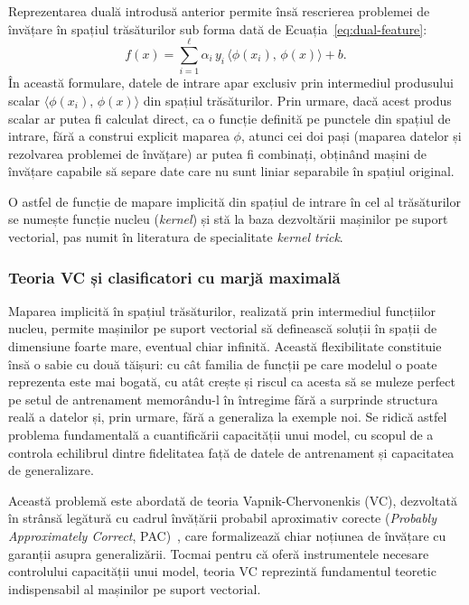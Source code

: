 Reprezentarea duală introdusă anterior permite însă rescrierea problemei de învățare în spațiul trăsăturilor sub forma dată de Ecuația~\ref{eq:dual-feature}:
\begin{equation}
  f(x) = \sum_{i=1}^{\ell} \alpha_i\, y_i\, \langle \phi(x_i),\, \phi(x) \rangle + b.
  \label{eq:dual-feature}
\end{equation}
În această formulare, datele de intrare apar exclusiv prin intermediul produsului scalar $\langle \phi(x_i),\, \phi(x) \rangle$ din spațiul trăsăturilor. Prin urmare, dacă acest produs scalar ar putea fi calculat direct, ca o funcție definită pe punctele din spațiul de intrare, fără a construi explicit maparea $\phi$, atunci cei doi pași (maparea datelor și rezolvarea problemei de învățare) ar putea fi combinați, obținând mașini de învățare capabile să separe date care nu sunt liniar separabile în spațiul original.

O astfel de funcție de mapare implicită din spațiul de intrare în cel al trăsăturilor se numește funcție nucleu (\textit{kernel}) și stă la baza dezvoltării mașinilor pe suport vectorial, pas numit în literatura de specialitate \textit{kernel trick}.

\subsubsection{Teoria VC și clasificatori cu marjă maximală}
Maparea implicită în spațiul trăsăturilor, realizată prin intermediul funcțiilor nucleu, permite mașinilor pe suport vectorial să definească soluții în spații de dimensiune foarte mare, eventual chiar infinită. Această flexibilitate constituie însă o sabie cu două tăișuri: cu cât familia de funcții pe care modelul o poate reprezenta este mai bogată, cu atât crește și riscul ca acesta să se muleze perfect pe setul de antrenament memorându-l în întregime fără a surprinde structura reală a datelor și, prin urmare, fără a generaliza la exemple noi. Se ridică astfel problema fundamentală a cuantificării capacității unui model, cu scopul de a controla echilibrul dintre fidelitatea față de datele de antrenament și capacitatea de generalizare.

Această problemă este abordată de teoria Vapnik-Chervonenkis (VC), dezvoltată în strânsă legătură cu cadrul învățării probabil aproximativ corecte (\textit{Probably Approximately Correct}, PAC)~\cite{valiant1984theory}, care formalizează chiar noțiunea de învățare cu garanții asupra generalizării. Tocmai pentru că oferă instrumentele necesare controlului capacității unui model, teoria VC reprezintă fundamentul teoretic indispensabil al mașinilor pe suport vectorial.

